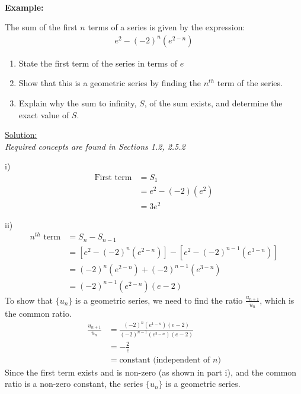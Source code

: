 \documentclass[12pt, a4paper, titlepage]{article}
\begin{document}
\textbf{\\ Example:}

The sum of the first $n$ terms of a series is given by the expression:
\begin{align*}
    e^2 - (-2)^n(e^{2 - n})
\end{align*}
\begin{enumerate}[label=(\roman*)]
    \item State the first term of the series in terms of $e$
    \item Show that this is a geometric series by finding the $n^{th}$ term of the series.
    \item Explain why the sum to infinity, $S$, of the sum exists, and determine the exact value of $S$.
\end{enumerate}

\begin{flushright}
\end{flushright}

\underline{Solution:} \\
\emph{Required concepts are found in Sections 1.2, 2.5.2}

i)
\begin{align*}
    \text{First term} &= S_1 \\
    &= e^2 - (-2)(e^2) \\
    &= 3e^2
\end{align*}

ii)
\begin{align*}
    n^{th} \text{ term} &= S_n - S_{n - 1} \\
    &= [e^2 - (-2)^n(e^{2 - n})] - [e^2 - (-2)^{n - 1}(e^{3 - n})] \\
    &= (-2)^n(e^{2 - n}) + (-2)^{n - 1}({e^{3 - n}}) \\
    &= (-2)^{n - 1}(e^{2 - n})(e - 2)
\end{align*}
To show that $\{u_n\}$ is a geometric series, we need to find the ratio $\frac{u_{n + 1}}{u_n}$, which is the common ratio.
\begin{align*}
    \frac{u_{n + 1}}{u_n} &= \frac{(-2)^{n}(e^{1 - n})(e - 2)}{(-2)^{n - 1}(e^{2 - n})(e - 2)} \\
    &= -\frac{2}{e} \\
    &= \text{constant (independent of } n \text{)}
\end{align*}
Since the first term exists and is non-zero (as shown in part i), and the common ratio is a non-zero constant, the series $\{u_n\}$ is a geometric series.
\end{document}
